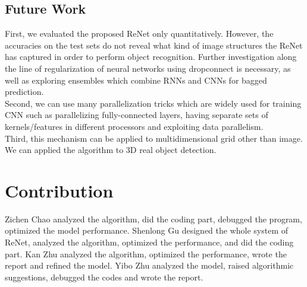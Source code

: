 \documentclass[final,leqno]{siamltex}
\begin{document}
\subsection{Future Work}
First, we evaluated the proposed ReNet only quantitatively. However, the accuracies on the test sets do not reveal what kind of image structures the ReNet has captured in order to perform object recognition. Further investigation along the line of regularization of neural networks using dropconnect is necessary, as well as exploring ensembles which combine RNNs and CNNs for bagged prediction.\cite{DBLP:journals/corr/BellZBG15} \cite{DBLP:journals/corr/ChenBPMY15}\cite{DBLP:journals/corr/HeH0LT15}\cite{DBLP:journals/corr/KalchbrennerDG15}\cite{DBLP:journals/corr/ZuoSWLWW15} \\

Second, we can use many parallelization tricks which are widely used for training CNN such as parallelizing fully-connected layers, having separate sets of kernels/features in different processors and exploiting data parallelism.\\

Third, this mechanism can be applied to multidimensional grid other than image. We can applied the algorithm to 3D real object detection.
\section*{Contribution}
Zichen Chao analyzed the algorithm, did the coding part, debugged the program, optimized the model performance. Shenlong Gu designed the whole system of ReNet, analyzed the algorithm, optimized the performance, and did the coding part. Kan Zhu analyzed the algorithm, optimized the performance, wrote the report and refined the model. Yibo Zhu analyzed the model, raised algorithmic suggestions, debugged the codes and wrote the report.\\


\end{document}

